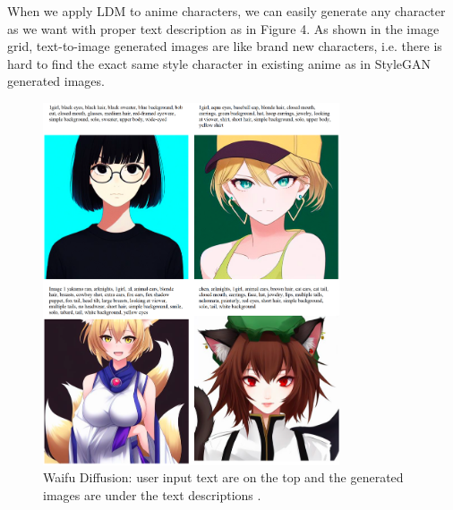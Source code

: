 When we apply LDM to anime characters,
we can easily generate any character as we want with proper text description as in Figure 4.
As shown in the image grid,
text-to-image generated images are like brand new characters,
i.e. there is hard to find the exact same style character in existing anime as in StyleGAN generated images.
\begin{figure}[h]
    \begin{center}
    \includegraphics[width=0.78\textwidth]{img/waifu_diffusion.png}
    \end{center}
    \caption{
        Waifu Diffusion:
        user input text are on the top
        and the generated images are under the text descriptions \cite{WaifuDiffusion}.
    }
\end{figure}